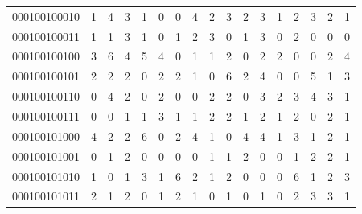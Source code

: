 \documentclass[10pt,a4paper]{article}
\begin{document}
\begin{longtable}{ |c|c|c|c|c|c|c|c|c|c|c|c|c|c|c|c|c| }
    000100100010              & 1                            & 4                                & 3                            & 1                              & 0   & 0   & 4   & 2   & 3   & 2   & 3   & 1   & 2   & 3   & 2   & 1   \\
    000100100011              & 1                            & 1                                & 3                            & 1                              & 0   & 1   & 2   & 3   & 0   & 1   & 3   & 0   & 2   & 0   & 0   & 0   \\
    000100100100              & 3                            & 6                                & 4                            & 5                              & 4   & 0   & 1   & 1   & 2   & 0   & 2   & 2   & 0   & 0   & 2   & 4   \\
    000100100101              & 2                            & 2                                & 2                            & 0                              & 2   & 2   & 1   & 0   & 6   & 2   & 4   & 0   & 0   & 5   & 1   & 3   \\
    000100100110              & 0                            & 4                                & 2                            & 0                              & 2   & 0   & 0   & 2   & 2   & 0   & 3   & 2   & 3   & 4   & 3   & 1   \\
    000100100111              & 0                            & 0                                & 1                            & 1                              & 3   & 1   & 1   & 2   & 2   & 1   & 2   & 1   & 2   & 0   & 2   & 1   \\
    000100101000              & 4                            & 2                                & 2                            & 6                              & 0   & 2   & 4   & 1   & 0   & 4   & 4   & 1   & 3   & 1   & 2   & 1   \\
    000100101001              & 0                            & 1                                & 2                            & 0                              & 0   & 0   & 0   & 1   & 1   & 2   & 0   & 0   & 1   & 2   & 2   & 1   \\
    000100101010              & 1                            & 0                                & 1                            & 3                              & 1   & 6   & 2   & 1   & 2   & 0   & 0   & 0   & 6   & 1   & 2   & 3   \\
    000100101011              & 2                            & 1                                & 2                            & 0                              & 1   & 2   & 1   & 0   & 1   & 0   & 1   & 0   & 2   & 3   & 3   & 1   \\

\end{longtable}
\end{document}
